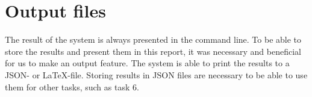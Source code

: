 \section{Output files}
The result of the system is always presented in the command line. To be able to store the results and present them in this report, it was necessary and beneficial for us to make an output feature. The system is able to print the results to a JSON- or LaTeX-file. 
Storing results in JSON files are necessary to be able to use them for other tasks, such as task 6.


